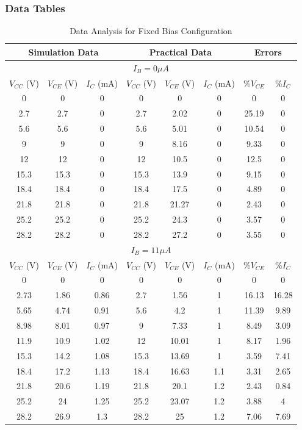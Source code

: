 \documentclass[12pt]{article}
\begin{document}
\subsubsection{Data Tables}
\bgroup
\def\arraystretch{1.5}
\begin{table}[h!]
    \centering
    \begin{tabular}{|c|c|c||c|c|c||c|c|}
        \hline
        \multicolumn{3}{|c||}{\textbf{Simulation Data}} & \multicolumn{3}{|c||}{\textbf{Practical Data}} & \multicolumn{2}{|c|}{\textbf{Errors}} \\ \hline\hline
        \multicolumn{8}{|c|}{\textbf{$I_B = 0\mu A$}} \\ \hline
        $V_{CC}$ (V) & $V_{CE}$ (V) & $I_C$ (mA) & $V_{CC}$ (V) & $V_{CE}$ (V) & $I_C$ (mA) & \%$V_{CE}$ & \%$I_C$ \\ \hline
        0 & 0 & 0 & 0 & 0 & 0 & 0 & 0 \\
        2.7 & 2.7 & 0 & 2.7 & 2.02 & 0 & 25.19 & 0  \\
        5.6 & 5.6 & 0 & 5.6 & 5.01 & 0 & 10.54 & 0 \\
        9 & 9 & 0 & 9 & 8.16 & 0 & 9.33 & 0 \\
        12 & 12 & 0 & 12 & 10.5 & 0 & 12.5 & 0 \\
        15.3 & 15.3 & 0 & 15.3 & 13.9 & 0 & 9.15 & 0 \\
        18.4 & 18.4 & 0 & 18.4 & 17.5 & 0 & 4.89 & 0 \\
        21.8 & 21.8 & 0 & 21.8 & 21.27 & 0 & 2.43 & 0 \\
        25.2 & 25.2 & 0 & 25.2 & 24.3 & 0 & 3.57 & 0 \\
        28.2 & 28.2 & 0 & 28.2 & 27.2 & 0 & 3.55 & 0 \\ \hline\hline
        \multicolumn{8}{|c|}{\textbf{$I_B = 11\mu A$}} \\ \hline
        $V_{CC}$ (V) & $V_{CE}$ (V) & $I_C$ (mA) & $V_{CC}$ (V) & $V_{CE}$ (V) & $I_C$ (mA) & \%$V_{CE}$ & \%$I_C$ \\ \hline
        0 & 0 & 0 & 0 & 0 & 0 & 0 & 0 \\
        2.73 & 1.86 & 0.86 & 2.7 & 1.56 & 1 & 16.13 & 16.28 \\
        5.65 & 4.74 & 0.91 & 5.6 & 4.2 & 1 & 11.39 & 9.89 \\
        8.98 & 8.01 & 0.97 & 9 & 7.33 & 1 & 8.49 & 3.09 \\
        11.9 & 10.9 & 1.02 & 12 & 10.01 & 1 & 8.17 & 1.96 \\
        15.3 & 14.2 & 1.08 & 15.3 & 13.69 & 1 & 3.59 & 7.41 \\
        18.4 & 17.2 & 1.13 & 18.4 & 16.63 & 1.1 & 3.31 & 2.65 \\
        21.8 & 20.6 & 1.19 & 21.8 & 20.1 & 1.2 & 2.43 & 0.84 \\
        25.2 & 24 & 1.25 & 25.2 & 23.07 & 1.2 & 3.88 & 4 \\
        28.2 & 26.9 & 1.3 & 28.2 & 25 & 1.2 & 7.06 & 7.69 \\ \hline
    \end{tabular}
    \caption{Data Analysis for Fixed Bias Configuration}
    \label{Fixed Bias}
\end{table}
\egroup
\end{document}
